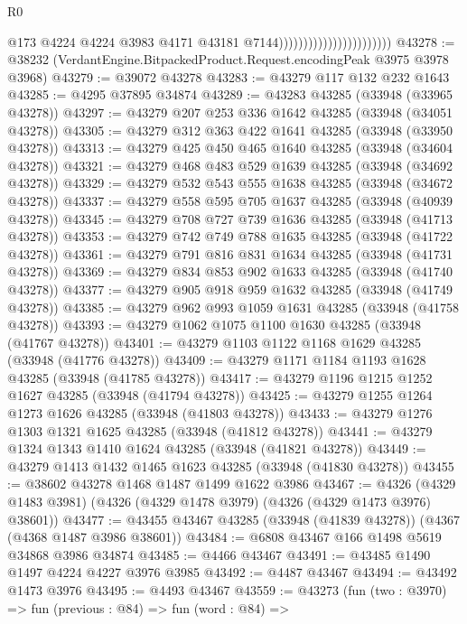 \begin{lexlean}{R0}
\begin{coremodule}
                                                  @173
                                                  @4224
                                                  @4224
                                                  @3983
                                                  @4171
                                                  @43181
                                                  @7144)))))))))))))))))))))))
@43278 := @38232 (VerdantEngine.BitpackedProduct.Request.encodingPeak @3975 @3978 @3968)
@43279 := @39072 @43278
@43283 := @43279 @117 @132 @232 @1643
@43285 := @4295 @37895 @34874
@43289 := @43283 @43285 (@33948 (@33965 @43278))
@43297 := @43279 @207 @253 @336 @1642 @43285 (@33948 (@34051 @43278))
@43305 := @43279 @312 @363 @422 @1641 @43285 (@33948 (@33950 @43278))
@43313 := @43279 @425 @450 @465 @1640 @43285 (@33948 (@34604 @43278))
@43321 := @43279 @468 @483 @529 @1639 @43285 (@33948 (@34692 @43278))
@43329 := @43279 @532 @543 @555 @1638 @43285 (@33948 (@34672 @43278))
@43337 := @43279 @558 @595 @705 @1637 @43285 (@33948 (@40939 @43278))
@43345 := @43279 @708 @727 @739 @1636 @43285 (@33948 (@41713 @43278))
@43353 := @43279 @742 @749 @788 @1635 @43285 (@33948 (@41722 @43278))
@43361 := @43279 @791 @816 @831 @1634 @43285 (@33948 (@41731 @43278))
@43369 := @43279 @834 @853 @902 @1633 @43285 (@33948 (@41740 @43278))
@43377 := @43279 @905 @918 @959 @1632 @43285 (@33948 (@41749 @43278))
@43385 := @43279 @962 @993 @1059 @1631 @43285 (@33948 (@41758 @43278))
@43393 := @43279 @1062 @1075 @1100 @1630 @43285 (@33948 (@41767 @43278))
@43401 := @43279 @1103 @1122 @1168 @1629 @43285 (@33948 (@41776 @43278))
@43409 := @43279 @1171 @1184 @1193 @1628 @43285 (@33948 (@41785 @43278))
@43417 := @43279 @1196 @1215 @1252 @1627 @43285 (@33948 (@41794 @43278))
@43425 := @43279 @1255 @1264 @1273 @1626 @43285 (@33948 (@41803 @43278))
@43433 := @43279 @1276 @1303 @1321 @1625 @43285 (@33948 (@41812 @43278))
@43441 := @43279 @1324 @1343 @1410 @1624 @43285 (@33948 (@41821 @43278))
@43449 := @43279 @1413 @1432 @1465 @1623 @43285 (@33948 (@41830 @43278))
@43455 := @38602 @43278 @1468 @1487 @1499 @1622 @3986
@43467 := @4326 (@4329 @1483 @3981) (@4326 (@4329 @1478 @3979) (@4326 (@4329 @1473 @3976) @38601))
@43477 := @43455 @43467 @43285 (@33948 (@41839 @43278)) (@4367 (@4368 @1487 @3986 @38601))
@43484 := @6808 @43467 @166 @1498 @5619 @34868 @3986 @34874
@43485 := @4466 @43467
@43491 := @43485 @1490 @1497 @4224 @4227 @3976 @3985
@43492 := @4487 @43467
@43494 := @43492 @1473 @3976
@43495 := @4493 @43467
@43559 := @43273
    (fun (two : @3970) =>
    fun (previous : @84) =>
    fun (word : @84) =>

\end{coremodule}
\end{lexlean}
